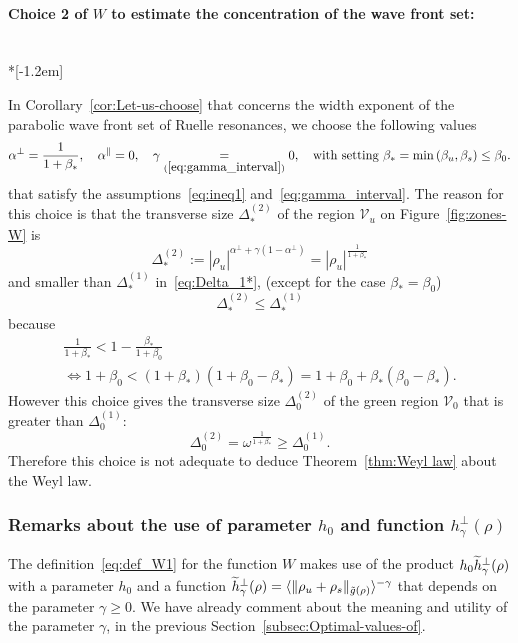 \documentclass[AHL,Unicode,longabstracts,published]{cedram}
\newcommand*\eq[1]{\underset{(#1)}{=}}
\newcommand{\clV}{\mathcal{V}}
\let\oldtilde\tilde
\renewcommand*{\tilde}[1]{\mathchoice{\widetilde{#1}}{\widetilde{#1}}{\oldtilde{#1}}{\oldtilde{#1}}}
\begin{document}
\paragraph{Choice 2 of $W$ to estimate the concentration of the wave front set:}\ \\*[-1.2em]

\noindent In Corollary~\ref{cor:Let-us-choose} that concerns the width exponent of the parabolic wave front set of Ruelle resonances, we choose the following values
\begin{equation}\label{eq:choice_2}
\alpha^{\perp}=\frac{1}{1+\beta_{*}},\quad\alpha^{\parallel}=0,\quad\gamma\eq{\eqref{eq:gamma_interval}}0,\quad\text{with setting }\beta_{*}=\min\left(\beta_{u},\beta_{s}\right)\le\beta_{0}.
\end{equation}
that satisfy the assumptions~\eqref{eq:ineq1} and~\eqref{eq:gamma_interval}. The reason for this choice is that the transverse size $\Delta_{*}^{(2)}$ of the region $\clV_{u}$ on Figure~\ref{fig:zones-W} is
\begin{equation}\label{eq:size_Delta_2*}
\Delta_{*}^{\left(2\right)}:=\left|\rho_{u}\right|^{\alpha^{\perp}+\gamma\left(1-\alpha^{\perp}\right)}=\left|\rho_{u}\right|^{\frac{1}{1+\beta_{*}}}
\end{equation}
and smaller than $\Delta_{*}^{(1)}$ in~\eqref{eq:Delta_1*}, (except for the case $\beta_{*}=\beta_{0}$)
\[
\Delta_{*}^{\left(2\right)}\leq\Delta_{*}^{\left(1\right)}
\]
because
\begin{multline*}
\frac{1}{1+\beta_{*}}<1-\frac{\beta_{*}}{1+\beta_{0}}\\\Longleftrightarrow
1+\beta_{0}<(1+\beta_{*})(1+\beta_{0}-\beta_{*})=1+\beta_{0}+\beta_{*}(\beta_{0}-\beta_{*}).
\end{multline*}
However this choice gives the transverse size $\Delta_{0}^{(2)}$ of the green region $\clV_{0}$ that is greater than $\Delta_{0}^{(1)}$:
\[
\Delta_{0}^{\left(2\right)}=\omega^{\frac{1}{1+\beta_{*}}}\geq\Delta_{0}^{\left(1\right)}.
\]
Therefore this choice is not adequate to deduce Theorem~\ref{thm:Weyl law} about the Weyl law.

\subsubsection{Remarks about the use of parameter \texorpdfstring{$h_{0}$}{h0} and function \texorpdfstring{$h_{\gamma}^{\perp}\left(\rho\right)$}{h gamma perp(rho)}}\label{subsec:Remarks-about-the}

The definition~\eqref{eq:def_W1} for the function $W$ makes use of the product $h_{0}\tilde{h}_{\gamma}^{\perp}(\rho)$ with a parameter $h_{0}$ and a function $\tilde{h}_{\gamma}^{\perp}(\rho)=\langle \Vert \rho_{u}+\rho_{s}\Vert _{\tilde{g}(\rho)}\rangle ^{-\gamma}$ that depends on the parameter $\gamma\geq0$. We have already comment about the meaning and utility of the parameter $\gamma$, in the previous Section~\ref{subsec:Optimal-values-of}.
\end{document}
